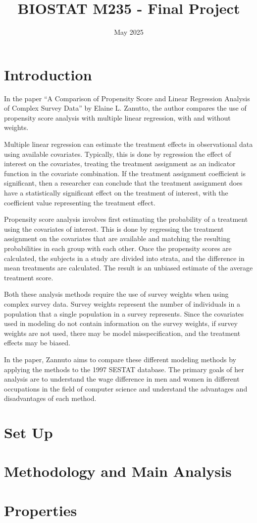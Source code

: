 \documentclass[12pt]{article}
\title{BIOSTAT M235 - Final Project}
\author{}
\date{May 2025}
\begin{document}
\doublespacing


\maketitle

\section{Introduction}

In the paper “A Comparison of Propensity Score and Linear Regression Analysis of Complex Survey Data” by Elaine L. Zanutto, the author compares the use of propensity score analysis with multiple linear regression, with and without weights.

Multiple linear regression can estimate the treatment effects in observational data using available covariates. Typically, this is done by regression the effect of interest on the covariates, treating the treatment assignment as an indicator function in the covariate combination. If the treatment assignment coefficient is significant, then a researcher can conclude that the treatment assignment does have a statistically significant effect on the treatment of interest, with the coefficient value representing the treatment effect.

Propensity score analysis involves first estimating the probability of a treatment using the covariates of interest. This is done by regressing the treatment assignment on the covariates that are available and matching the resulting probabilities in each group with each other. Once the propensity scores are calculated, the subjects in a study are divided into strata, and the difference in mean treatments are calculated. The result is an unbiased estimate of the average treatment score.

Both these analysis methods require the use of survey weights when using complex survey data. Survey weights represent the number of individuals in a population that a single population in a survey represents. Since the covariates used in modeling do not contain information on the survey weights, if survey weights are not used, there may be model misspecification, and the treatment effects may be biased.

In the paper, Zannuto aims to compare these different modeling methods by applying the methods to the 1997 SESTAT database. The primary goals of her analysis are to understand the wage difference in men and women in different occupations in the field of computer science and understand the advantages and disadvantages of each method.


\section{Set Up}

\section{Methodology and Main Analysis}

\section{Properties}
\end{document}
